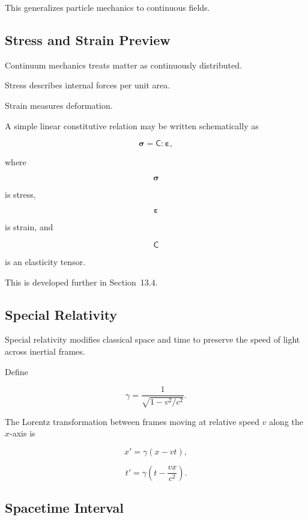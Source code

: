 This generalizes particle mechanics to continuous fields.

\subsection{Stress and Strain Preview}
\label{subsec:stress-strain-preview}

Continuum mechanics treats matter as continuously distributed.

Stress describes internal forces per unit area.

Strain measures deformation.

A simple linear constitutive relation may be written schematically as

\[
\boxed{
\boldsymbol{\sigma}
=
\mathsf{C}:\boldsymbol{\varepsilon},
}
\]

where

\[
\boldsymbol{\sigma}
\]

is stress,

\[
\boldsymbol{\varepsilon}
\]

is strain, and

\[
\mathsf{C}
\]

is an elasticity tensor.

This is developed further in Section~13.4.

\subsection{Special Relativity}
\label{subsec:special-relativity}

Special relativity modifies classical space and time to preserve the speed
of light across inertial frames.

Define

\[
\boxed{
\gamma
=
\frac{1}
{\sqrt{1-v^2/c^2}}.
}
\]

The Lorentz transformation between frames moving at relative speed \(v\)
along the \(x\)-axis is

\[
\boxed{
x'
=
\gamma(x-vt),
}
\]

\[
\boxed{
t'
=
\gamma
\left(
t-\frac{vx}{c^2}
\right).
}
\]

\subsection{Spacetime Interval}
\label{subsec:spacetime-interval}

